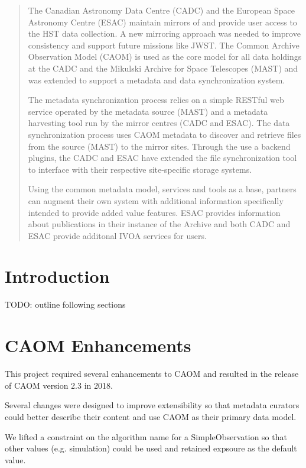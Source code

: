 \documentclass[11pt,twoside]{article}
\begin{document}
\begin{abstract}

The Canadian Astronomy Data Centre (CADC) and the European Space Astronomy Centre (ESAC) maintain mirrors of and provide user access to the HST data collection. A new mirroring approach was needed to improve consistency and support future missions like JWST. The Common Archive Observation Model (CAOM) is used as the core model for all data holdings at the CADC and the Mikulski Archive for Space Telescopes (MAST) and was extended to support a metadata and data synchronization system.

The metadata synchronization process relies on a simple RESTful web service operated by the metadata source (MAST) and a metadata harvesting tool run by the mirror centres (CADC and ESAC). The data synchronization process uses  CAOM metadata to discover and retrieve files from the source (MAST) to the mirror sites.  Through the use a backend plugins, the CADC and ESAC have extended the file synchronization tool to interface with their respective site-specific storage systems.

Using the common metadata model, services and tools as a base, partners can augment their own system with additional information specifically intended to provide added value features. ESAC provides information about publications in their instance of the Archive and both CADC and ESAC provide additonal IVOA services for users.
  
\end{abstract}

\section{Introduction}

TODO: outline following sections

\section{CAOM Enhancements}

This project required several enhancements to CAOM and resulted in the release of CAOM version 2.3 in 2018.

Several changes were designed to improve extensibility so that metadata curators could better describe their content and use CAOM as their primary data model.

We lifted a constraint on the algorithm name for a SimpleObservation so that other values (e.g. simulation) could be used and retained expsoure as the default value.
\end{document}
